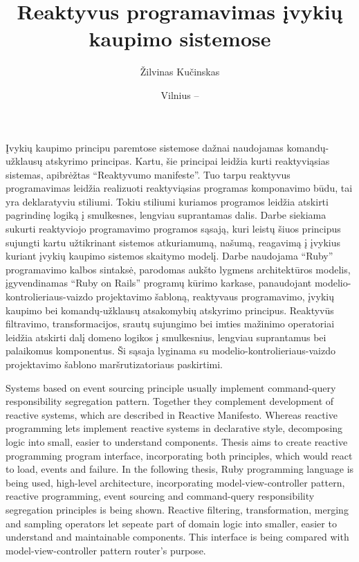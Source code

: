 \documentclass{VUMIFPSmagistrinis}
\title{Reaktyvus programavimas įvykių kaupimo sistemose}
\author{Žilvinas Kučinskas}
\date{Vilnius – \the\year}
\begin{document}
\maketitle



Įvykių kaupimo principu paremtose sistemose dažnai naudojamas komandų-užklausų atskyrimo principas. Kartu, šie principai leidžia kurti reaktyviąsias sistemas, apibrėžtas ``Reaktyvumo manifeste''. Tuo tarpu reaktyvus programavimas leidžia realizuoti reaktyviąsias programas komponavimo būdu, tai yra deklaratyviu stiliumi. Tokiu stiliumi kuriamos programos leidžia atskirti pagrindinę logiką į smulkesnes, lengviau suprantamas dalis. Darbe siekiama sukurti reaktyviojo programavimo programos sąsają, kuri leistų šiuos principus sujungti kartu užtikrinant sistemos atkuriamumą, našumą, reagavimą į įvykius kuriant įvykių kaupimo sistemos skaitymo modelį. Darbe naudojama ``Ruby'' programavimo kalbos sintaksė, parodomas aukšto lygmens architektūros modelis, įgyvendinamas ``Ruby on Rails'' programų kūrimo karkase, panaudojant modelio-kontrolieriaus-vaizdo projektavimo šabloną, reaktyvaus programavimo, įvykių kaupimo bei komandų-užklausų atsakomybių atskyrimo principus. Reaktyvūs filtravimo, transformacijos, srautų sujungimo bei imties mažinimo operatoriai leidžia atskirti dalį domeno logikos į smulkesnius, lengviau suprantamus bei palaikomus komponentus. Ši sąsaja lyginama su modelio-kontrolieriaus-vaizdo projektavimo šablono maršrutizatoriaus paskirtimi.



Systems based on event sourcing principle usually implement command-query responsibility segregation pattern. Together they complement development of reactive systems, which are described in Reactive Manifesto. Whereas reactive programming lets implement reactive systems in declarative style, decomposing logic into small, easier to understand components. Thesis aims to create reactive programming program interface, incorporating both principles, which would react to load, events and failure. In the following thesis, Ruby programming language is being used, high-level architecture, incorporating model-view-controller pattern, reactive programming, event sourcing and command-query responsibility segregation principles is being shown. Reactive filtering, transformation, merging and sampling operators let sepeate part of domain logic into smaller, easier to understand and maintainable components. This interface is being compared with model-view-controller pattern router's purpose.
\end{document}
